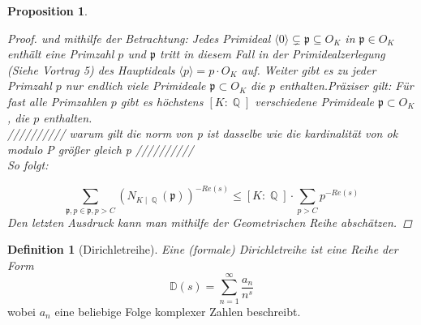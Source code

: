 \documentclass[10pt,a4paper]{article}
\theoremstyle{plain}
\newtheorem{prop}[thm]{Proposition}
\theoremstyle{definition}
\newtheorem{defn}{Definition}[section]
\theoremstyle{remark}
\DeclareMathOperator{\Q}{\mathbb{Q}}
\begin{document}
\begin{prop}
\begin{proof}
und mithilfe der Betrachtung: Jedes Primideal $\langle0\rangle\subsetneq \mathfrak{p} \subseteq O_{\textit{K}}$ in $\mathfrak{p} \in O_K$ enthält eine Primzahl $p$ und $\mathfrak{p}$ tritt in diesem Fall in der Primidealzerlegung (Siehe Vortrag 5) des Hauptideals $\langle p \rangle=p\cdot O_K$ auf. Weiter gibt es zu jeder Primzahl $p$ nur endlich viele Primideale $\mathfrak{p}\subset O_K$ die $p$ enthalten.Präziser gilt: Für fast alle Primzahlen $p$ gibt es höchstens $[K\colon \Q]$ verschiedene Primideale $\mathfrak{p}\subset O_K$, die $p$ enthalten. 
\\
////////// warum gilt die norm von p ist dasselbe wie die kardinalität von ok modulo P größer gleich p
//////////
\\
So folgt:

$$\sum_{\mathfrak{p},p\in \mathfrak{p},p>C}(N_{K\mid \Q}(\mathfrak{p}))^{-Re(s)} \leq [K\colon\Q]\cdot \sum_{p>C}p^{-Re(s)} $$Den letzten Ausdruck kann man mithilfe der Geometrischen Reihe abschätzen.
\end{proof}
\end{prop}


\begin{defn}[Dirichletreihe]

\textit{Eine (formale) Dirichletreihe ist eine Reihe der Form $$\mathbb{D}(s) = \sum_{n =1}^{\infty}\frac{a_n}{n^s} $$}wobei $a_n$ eine beliebige Folge komplexer Zahlen beschreibt.

\end{defn}
\end{document}

